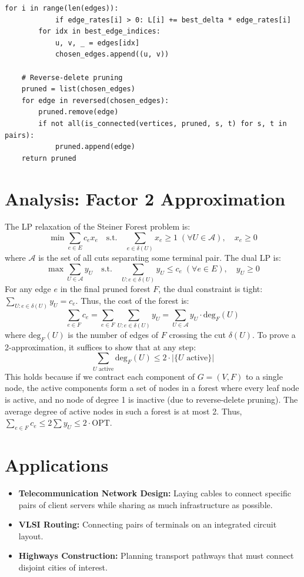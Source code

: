 \begin{lstlisting}[style=python, caption=Primal-Dual Steiner Forest Algorithm]
        for i in range(len(edges)):
            if edge_rates[i] > 0: L[i] += best_delta * edge_rates[i]
        for idx in best_edge_indices:
            u, v, _ = edges[idx]
            chosen_edges.append((u, v))
            
    # Reverse-delete pruning
    pruned = list(chosen_edges)
    for edge in reversed(chosen_edges):
        pruned.remove(edge)
        if not all(is_connected(vertices, pruned, s, t) for s, t in pairs):
            pruned.append(edge)
    return pruned
\end{lstlisting}

\section{Analysis: Factor 2 Approximation}
The LP relaxation of the Steiner Forest problem is:
\[
\min \sum_{e \in E} c_e x_e \quad \text{s.t.} \quad \sum_{e \in \delta(U)} x_e \ge 1 \; (\forall U \in \mathcal{A}), \quad x_e \ge 0
\]
where $\mathcal{A}$ is the set of all cuts separating some terminal pair. The dual LP is:
\[
\max \sum_{U \in \mathcal{A}} y_U \quad \text{s.t.} \quad \sum_{U: e \in \delta(U)} y_U \le c_e \; (\forall e \in E), \quad y_U \ge 0
\]
For any edge $e$ in the final pruned forest $F$, the dual constraint is tight: $\sum_{U: e \in \delta(U)} y_U = c_e$. Thus, the cost of the forest is:
\[
\sum_{e \in F} c_e = \sum_{e \in F} \sum_{U: e \in \delta(U)} y_U = \sum_{U \in \mathcal{A}} y_U \cdot \text{deg}_F(U)
\]
where $\text{deg}_F(U)$ is the number of edges of $F$ crossing the cut $\delta(U)$. To prove a 2-approximation, it suffices to show that at any step:
\[
\sum_{U \text{ active}} \text{deg}_F(U) \le 2 \cdot |\{U \text{ active}\}|
\]
This holds because if we contract each component of $G=(V, F)$ to a single node, the active components form a set of nodes in a forest where every leaf node is active, and no node of degree 1 is inactive (due to reverse-delete pruning). The average degree of active nodes in such a forest is at most 2. Thus, $\sum_{e \in F} c_e \le 2 \sum y_U \le 2 \cdot \text{OPT}$.

\section{Applications}
\begin{itemize}
    \item \textbf{Telecommunication Network Design:} Laying cables to connect specific pairs of client servers while sharing as much infrastructure as possible.
    \item \textbf{VLSI Routing:} Connecting pairs of terminals on an integrated circuit layout.
    \item \textbf{Highways Construction:} Planning transport pathways that must connect disjoint cities of interest.
\end{itemize}

